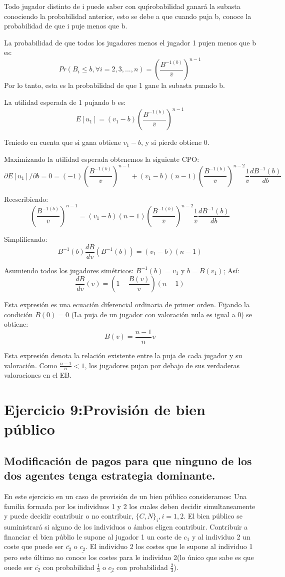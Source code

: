 \documentclass{article}
\begin{document}
Todo jugador distinto de i puede saber con qu\'probabilidad ganar\'a la subasta conociendo la probabilidad anterior, esto se debe a que cuando puja b, conoce la probabilidad de que i puje menos que b.

La probabilidad de que todos los jugadores menos el jugador 1 pujen menos que b es:
$$Pr(B_i\leq b, \forall i=2,3,...,n)=(\frac{B^{-1(b)}}{\bar{v}})^{n-1}$$
 Por lo tanto, esta es la probabilidad de que 1 gane la subasta puando b.

La utilidad esperada de 1 pujando b es:
$$E[u_1]=(v_1-b)(\frac{B^{-1(b)}}{\bar{v}})^{n-1}$$

Teniedo en cuenta que si gana obtiene $v_1-b$, y si pierde obtiene 0.

Maximizando la utilidad esperada obtenemos la siguiente CPO:
$$\partial E[u_1]/\partial b=0=(-1)(\frac{B^{-1(b)}}{\bar{v}})^{n-1}+(v_1-b)(n-1)(\frac{B^{-1(b)}}{\bar{v}})^{n-2}\frac{1}{\bar{v}}\frac{dB^{-1}(b)}{db}$$

Reescribiendo:
$$(\frac{B^{-1(b)}}{\bar{v}})^{n-1}=(v_1-b)(n-1)(\frac{B^{-1(b)}}{\bar{v}})^{n-2}\frac{1}{\bar{v}}\frac{dB^{-1}(b)}{db}$$

Simplificando:
$$B^{-1}(b)\frac{dB}{dv}(B^{-1}(b))=(v_1-b)(n-1)$$

Asumiendo todos los jugadores sim\'etricos: $B^{-1}(b)=v_1$ y $b=B(v_1)$; As\'i:
$$\frac{dB}{dv}(v)=(1-\frac{B(v)}{v})(n-1)$$

Esta expresi\'on es una ecuaci\'on diferencial ordinaria de primer orden. Fijando la condici\'on $B(0)=0$ (La puja de un jugador con valoraci\'on nula es igual a 0) se obtiene:
$$B(v)=\frac{n-1}{n}v$$

Esta expresi\'on denota la relaci\'on existente entre la puja de cada jugador y su valoraci\'on. Como $\frac{n-1}{n}<1$, los jugadores pujan por debajo de sus verdaderas valoraciones en el EB.



\section{Ejercicio 9:Provisi\'on de bien p\'ublico}
\subsection{Modificaci\'on de pagos para que ninguno de los dos agentes tenga estrategia dominante.}

En este ejercicio en un caso de provisión de un bien p\'ublico consideramos: Una familia formada por los individuos 1 y 2 los cuales deben decidir simultaneamente y puede decidir contribuir o no contribuir, $\{C,N\}_i, i=1,2$. El bien p\'ublico se suministrar\'a si alguno de los individuos o \'ambos eligen contribuir. Contribuir a financiar el bien p\'ublio le supone al jugador 1 un coste de $c_1$ y al individuo 2 un coste que puede ser $\overline{c_2}$ o $\underline{c_2}$. El individuo 2 los costes que le supone al individuo 1 pero este \'ultimo no conoce los costes para le individuo 2(lo único que sabe es que ouede ser $\overline{c_2}$ con probabilidad $\frac{1}{3}$ o $\underline{c_2}$ con probabilidad $\frac{2}{3}$).
\end{document}
